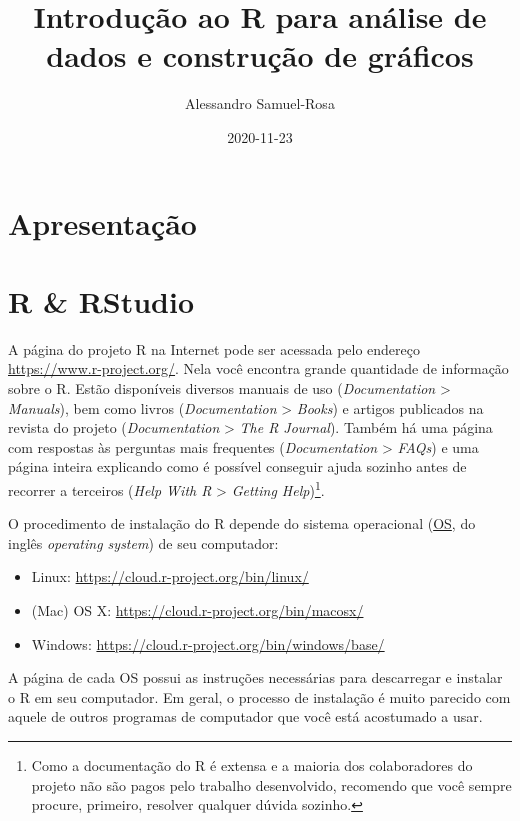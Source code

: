 \documentclass[
]{book}
\title{Introdução ao R para análise de dados e construção de gráficos}
\author{Alessandro Samuel-Rosa}
\date{2020-11-23}
\providecommand{\tightlist}{%
  \setlength{\itemsep}{0pt}\setlength{\parskip}{0pt}}
\begin{document}
\maketitle

{
\setcounter{tocdepth}{1}
\tableofcontents
}
\hypertarget{apresentauxe7uxe3o}{%
\chapter{Apresentação}\label{apresentauxe7uxe3o}}

\hypertarget{r-rstudio}{%
\chapter{R \& RStudio}\label{r-rstudio}}

A página do projeto R na Internet pode ser acessada pelo endereço \url{https://www.r-project.org/}. Nela você encontra grande quantidade de informação sobre o R. Estão disponíveis diversos manuais de uso (\emph{Documentation} \textgreater{} \emph{Manuals}), bem como livros (\emph{Documentation} \textgreater{} \emph{Books}) e artigos publicados na revista do projeto (\emph{Documentation} \textgreater{} \emph{The R Journal}). Também há uma página com respostas às perguntas mais frequentes (\emph{Documentation} \textgreater{} \emph{FAQs}) e uma página inteira explicando como é possível conseguir ajuda sozinho antes de recorrer a terceiros (\emph{Help With R} \textgreater{} \emph{Getting Help})\footnote{Como a documentação do R é extensa e a maioria dos colaboradores do projeto não são pagos pelo trabalho desenvolvido, recomendo que você sempre procure, primeiro, resolver qualquer dúvida sozinho.}.

O procedimento de instalação do R depende do sistema operacional (\href{https://en.wikipedia.org/wiki/Operating_system}{OS}, do inglês \emph{operating system}) de seu computador:

\begin{itemize}
\tightlist
\item
  Linux: \url{https://cloud.r-project.org/bin/linux/}
\item
  (Mac) OS X: \url{https://cloud.r-project.org/bin/macosx/}
\item
  Windows: \url{https://cloud.r-project.org/bin/windows/base/}
\end{itemize}

A página de cada OS possui as instruções necessárias para descarregar e instalar o R em seu computador. Em geral, o processo de instalação é muito parecido com aquele de outros programas de computador que você está acostumado a usar.
\end{document}
